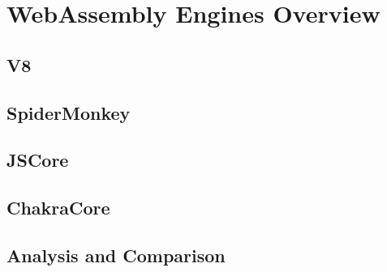 \chapter{WebAssembly Engines Overview}

\section{V8}

\section{SpiderMonkey}

\section{JSCore}

\section{ChakraCore}

\section{Analysis and Comparison}
\subsection{}
\subsection{}
